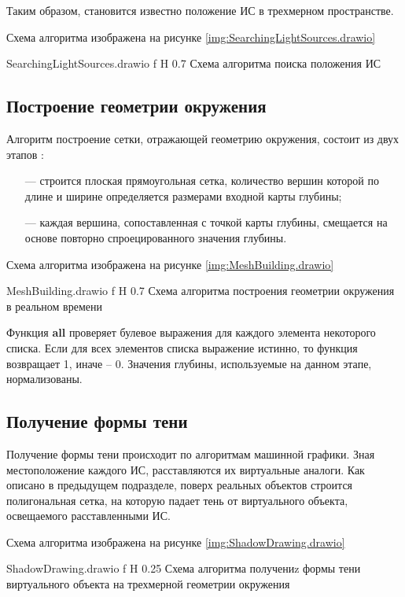 Таким образом, становится известно положение ИС в трехмерном пространстве.

Схема алгоритма изображена на рисунке \ref{img:SearchingLightSources.drawio}

{SearchingLightSources.drawio}
{f}
{H}
{0.7\textwidth}
{Схема алгоритма поиска положения ИС}

\subsection{Построение геометрии окружения}

Алгоритм построение сетки, отражающей геометрию окружения, состоит из двух этапов \cite{du2020depthlab}: 

\begin{itemize}
	\item[---] строится плоская прямоугольная сетка, количество вершин которой по длине и ширине определяется размерами входной карты глубины;
	\item[---] каждая вершина, сопоставленная с точкой карты глубины, смещается на основе повторно спроецированного значения глубины.
\end{itemize}

Схема алгоритма изображена на рисунке \ref{img:MeshBuilding.drawio}

{MeshBuilding.drawio}
{f}
{H}
{0.7\textwidth}
{Схема алгоритма построения геометрии окружения в реальном времени}

Функция \textbf{all} проверяет булевое выражения для каждого элемента некоторого списка. Если для всех элементов списка выражение истинно, то функция возвращает 1, иначе -- 0. Значения глубины, используемые на данном этапе, нормализованы.

\subsection{Получение формы тени}

Получение формы тени происходит по алгоритмам машинной графики. Зная местоположение каждого ИС, расставляются их виртуальные аналоги. Как описано в предыдущем подразделе, поверх реальных объектов строится полигональная сетка, на которую падает тень от виртуального объекта, освещаемого расставленными ИС.

Схема алгоритма изображена на рисунке \ref{img:ShadowDrawing.drawio}

{ShadowDrawing.drawio}
{f}
{H}
{0.25\textwidth}
{Схема алгоритма получениz формы тени виртуального объекта на трехмерной геометрии окружения}

